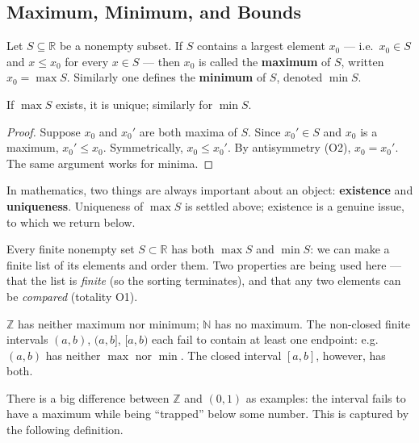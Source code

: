 \documentclass[11pt]{report}
\begin{document}
\subsection{Maximum, Minimum, and Bounds}

\begin{defbox}
Let $S \subseteq \mathbb{R}$ be a nonempty subset. If $S$ contains a largest element $x_0$ --- i.e.\ $x_0 \in S$ and $x \leq x_0$ for every $x \in S$ --- then $x_0$ is called the \textbf{maximum} of $S$, written $x_0 = \max S$. Similarly one defines the \textbf{minimum} of $S$, denoted $\min S$.
\end{defbox}

\begin{propbox}
If $\max S$ exists, it is unique; similarly for $\min S$.
\end{propbox}

\begin{proof}
Suppose $x_0$ and $x_0'$ are both maxima of $S$. Since $x_0' \in S$ and $x_0$ is a maximum, $x_0' \leq x_0$. Symmetrically, $x_0 \leq x_0'$. By antisymmetry (O2), $x_0 = x_0'$. The same argument works for minima.
\end{proof}

\begin{rembox}
In mathematics, two things are always important about an object: \textbf{existence} and \textbf{uniqueness}. Uniqueness of $\max S$ is settled above; existence is a genuine issue, to which we return below.
\end{rembox}

\begin{exbox}
Every finite nonempty set $S \subset \mathbb{R}$ has both $\max S$ and $\min S$: we can make a finite list of its elements and order them. Two properties are being used here --- that the list is \emph{finite} (so the sorting terminates), and that any two elements can be \emph{compared} (totality O1).
\end{exbox}

\begin{exbox}
$\mathbb{Z}$ has neither maximum nor minimum; $\mathbb{N}$ has no maximum. The non-closed finite intervals $(a,b)$, $(a,b]$, $[a,b)$ each fail to contain at least one endpoint: e.g.\ $(a,b)$ has neither $\max$ nor $\min$. The closed interval $[a,b]$, however, has both.
\end{exbox}

There is a big difference between $\mathbb{Z}$ and $(0,1)$ as examples: the interval fails to have a maximum while being ``trapped'' below some number. This is captured by the following definition.
\end{document}
